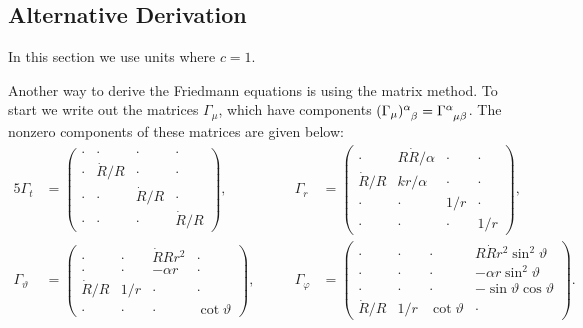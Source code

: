 \documentclass[fleqn]{NotesClass}
\newcommand*{\christoffel}[3]{\tensor{\Gamma}{^{#1}_{{#2}{#3}}}}
\begin{document}
    \subsection{Alternative Derivation}
    \begin{wrn}
        In this section we use units where \(c = 1\).
    \end{wrn}
    Another way to derive the Friedmann equations is using the matrix method.
    To start we write out the matrices \(\Gamma_\mu\), which have components \(\tensor{(\Gamma_\mu)}{^\alpha_\beta} = \christoffel{\alpha}{\mu}{\beta}\).
    The nonzero components of these matrices are given below:
    \begin{alignat*}{5}
        \Gamma_t &= 
        \begin{pmatrix}
            \cdot & \cdot & \cdot & \cdot\\
            \cdot & \dot{R}/R & \cdot & \cdot\\
            \cdot & \cdot & \dot{R}/R & \cdot\\
            \cdot & \cdot & \cdot & \dot{R}/R
        \end{pmatrix}
        , \qquad & \Gamma_r &=
        \begin{pmatrix}
            \cdot & R\dot{R}/\alpha & \cdot & \cdot\\
            \dot{R}/R & kr/\alpha & \cdot & \cdot\\
            \cdot & \cdot & 1/r & \cdot\\
            \cdot & \cdot & \cdot & 1/r
        \end{pmatrix}
        ,\\
        \Gamma_{\vartheta} &= 
        \begin{pmatrix}
            \cdot & \cdot & \dot{R}Rr^2 & \cdot\\
            \cdot & \cdot & -\alpha r & \cdot\\
            \dot{R}/R & 1/r & \cdot & \cdot\\
            \cdot & \cdot & \cdot & \cot\vartheta
        \end{pmatrix}
        , \qquad & \Gamma_\varphi &=
        \begin{pmatrix}
            \cdot & \cdot & \cdot & R\dot{R}r^2\sin^2\vartheta\\
            \cdot & \cdot & \cdot & -\alpha r\sin^2\vartheta\\
            \cdot & \cdot & \cdot & -\sin\vartheta\cos\vartheta\\
            \dot{R}/R & 1/r & \cot\vartheta & \cdot
        \end{pmatrix}
        .
    \end{alignat*}
    
\end{document}
